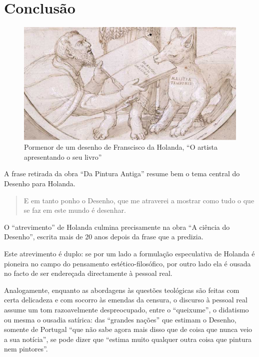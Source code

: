\documentclass{article}
\begin{document}
\section{Conclusão}

\begin{figure}
\centering\includegraphics[height=0.3\textheight,keepaspectratio]
                          {images/malatia-temporis.png}
  \caption{Pormenor de um desenho de Franscisco da Holanda, ``O
    artista apresentando o seu livro''}
  \label{fig:3}
\end{figure}

A frase retirada da obra ``Da Pintura Antiga'' resume bem o tema
central do Desenho para Holanda. \cite{holanda-pintura}

\begin{quote}
  E em tanto ponho o Desenho, que me atraverei a mostrar como tudo o
  que se faz em este mundo é desenhar.
\end{quote}

O ``atrevimento'' de Holanda culmina precisamente na obra ``A ciência
do Desenho'', escrita mais de 20 anos depois da frase que a predizia.

Este atrevimento é duplo: se por um lado a formulação especulativa de
Holanda é pioneira no campo do pensamento estético-filosófico, por
outro lado ela é ousada no facto de ser endereçada directamente à
pessoal real.

Analogamente, enquanto as abordagens às questões teológicas são feitas
com certa delicadeza e com socorro às emendas da censura, o discurso à
pessoal real assume um tom razoavelmente despreocupado, entre o
``queixume'', o didatismo ou mesma o ousadia satírica: das ``grandes
nações'' que estimam o Desenho, somente de Portugal ``que não sabe
agora mais disso que de coisa que nunca veio a sua notícia'', se pode
dizer que ``estima muito qualquer outra coisa que pintura nem
pintores''.
\end{document}
